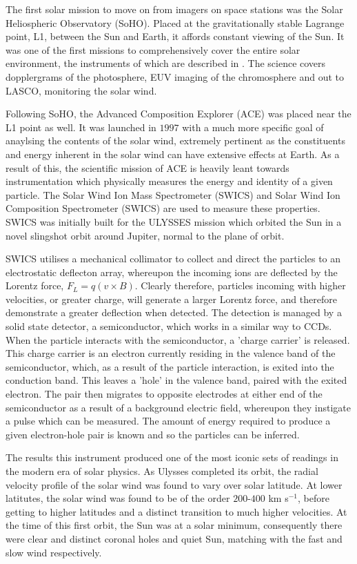 The first solar mission to move on from imagers on space stations was the Solar Heliospheric Observatory (SoHO).
Placed at the gravitationally stable Lagrange point, L1, between the Sun and Earth, it affords constant viewing of the Sun.
It was one of the first missions to comprehensively cover the entire solar environment, the instruments of which are described in \cite{StCyr}.
The science covers dopplergrams of the photosphere, EUV imaging of the chromosphere and out to LASCO, monitoring the solar wind.

Following SoHO, the Advanced Composition Explorer (ACE) \citep{Garrard1997} was placed near the L1 point as well.
It was launched in $1997$ with a much more specific goal of anaylsing the contents of the solar wind, extremely pertinent as the constituents and energy inherent in the solar wind can have extensive effects at Earth.
As a result of this, the scientific mission of ACE is heavily leant towards instrumentation which physically measures the energy and identity of a given particle.
The Solar Wind Ion Mass Spectrometer (SWICS) and Solar Wind Ion Composition Spectrometer (SWICS) are used to measure these properties.
SWICS was initially built for the ULYSSES \cite{Ulysses1992} mission which orbited the Sun in a novel slingshot orbit around Jupiter, normal to the plane of orbit.

SWICS utilises a mechanical collimator to collect and direct the particles to an electrostatic deflecton array, whereupon the incoming ions are deflected by the Lorentz force, $F_L = q(v \times B)$.
Clearly therefore, particles incoming with higher velocities, or greater charge, will generate a larger Lorentz force, and therefore demonstrate a greater deflection when detected.
The detection is managed by a solid state detector, a semiconductor, which works in a similar way to CCDs.
When the particle interacts with the semiconductor, a 'charge carrier' is released.
This charge carrier is an electron currently residing in the valence band of the semiconductor, which, as a result of the particle interaction, is exited into the conduction band.
This leaves a 'hole' in the valence band, paired with the exited electron. 
The pair then migrates to opposite electrodes at either end of the semiconductor as a result of a background electric field, whereupon they instigate a pulse which can be measured.
The amount of energy required to produce a given electron-hole pair is known and so the particles can be inferred.

The results this instrument produced one of the most iconic sets of readings in the modern era of solar physics.
As Ulysses completed its orbit, the radial velocity profile of the solar wind was found to vary over solar latitude.
At lower latitutes, the solar wind was found to be of the order $200$-$400$ km s$^{-1}$, before getting to higher latitudes and a distinct transition to much higher velocities.
At the time of this first orbit, the Sun was at a solar minimum, consequently there were clear and distinct coronal holes and quiet Sun, matching with the fast and slow wind respectively.

